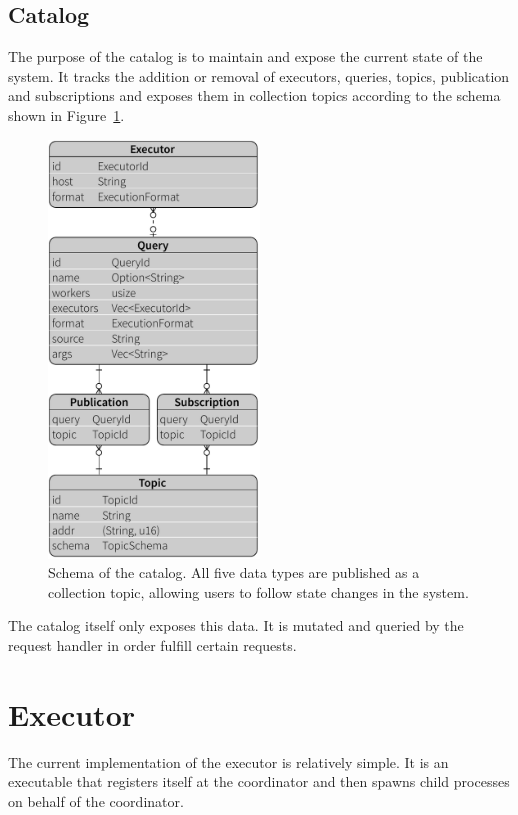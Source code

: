 \subsection{Catalog}

The purpose of the catalog is to maintain and expose the current state of the
system. It tracks the addition or removal of executors, queries, topics,
publication and subscriptions and exposes them in collection topics according
to the schema shown in Figure~\ref{fig:model}.

\begin{figure}[htb]
  \centering
    \includegraphics[width=0.5\textwidth]{figures/model}
  \caption[Schema of the catalog.]{Schema of the catalog. All five data types
  are published as a collection topic, allowing users to follow state changes
  in the system.}
  \label{fig:model}
\end{figure}

The catalog itself only exposes this data. It is mutated and queried by the
request handler in order fulfill certain requests.

\section{Executor}

The current implementation of the executor is relatively simple. It is an executable
that registers itself at the coordinator and then spawns child processes on behalf
of the coordinator.

